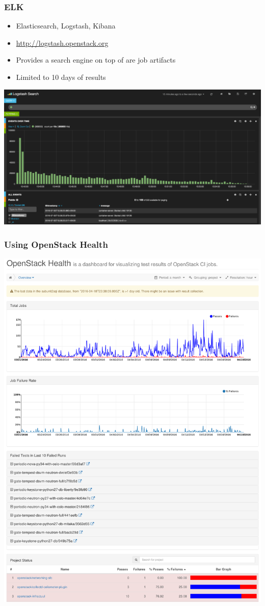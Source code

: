 \documentclass[aspectratio=43,11pt,hyperref={colorlinks=true}]{beamer}
\begin{document}
\begin{frame}
  \frametitle{ELK}
  \begin{itemize}
    \item Elasticsearch, Logstash, Kibana
    \item \href{http://logstash.openstack.org}{http://logstash.openstack.org}
    \item Provides a search engine on top of are job artifacts
    \item Limited to 10 days of results
  \end{itemize}
  \begin{center}
    \includegraphics[width=.75\textwidth]{kibana-sample.png}
  \end{center}
\end{frame}

\begin{frame}
    \frametitle{Using OpenStack Health}
    \begin{center}
        \includegraphics[height=.9\textheight]{HomePage.png}
    \end{center}
\end{frame}
\end{document}
